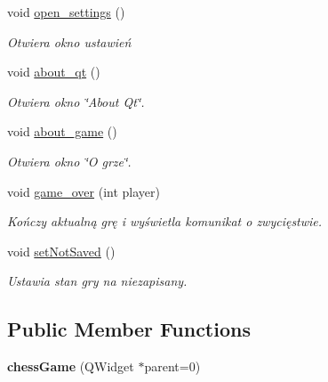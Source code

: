 \begin{DoxyCompactItemize}
\mbox{\label{classchess_game_af4636d3a148b8e910ac093bf419fbac7}} 
void \hyperlink{classchess_game_af4636d3a148b8e910ac093bf419fbac7}{open\+\_\+settings} ()
\begin{DoxyCompactList}\small\item\em Otwiera okno ustawień \end{DoxyCompactList}\item 
\mbox{\label{classchess_game_a00156441ff76452fd40b572683ea99b9}} 
void \hyperlink{classchess_game_a00156441ff76452fd40b572683ea99b9}{about\+\_\+qt} ()
\begin{DoxyCompactList}\small\item\em Otwiera okno \char`\"{}\+About Qt\char`\"{}. \end{DoxyCompactList}\item 
\mbox{\label{classchess_game_a86245fb64348f772be40001d4f063f03}} 
void \hyperlink{classchess_game_a86245fb64348f772be40001d4f063f03}{about\+\_\+game} ()
\begin{DoxyCompactList}\small\item\em Otwiera okno \char`\"{}\+O grze\char`\"{}. \end{DoxyCompactList}\item 
\mbox{\label{classchess_game_a209b5541bf8d34b7f9ff0c48972bf972}} 
void \hyperlink{classchess_game_a209b5541bf8d34b7f9ff0c48972bf972}{game\+\_\+over} (int player)
\begin{DoxyCompactList}\small\item\em Kończy aktualną grę i wyświetla komunikat o zwycięstwie. \end{DoxyCompactList}\item 
\mbox{\label{classchess_game_aa53efb2e6476d9a7445e7a166ebe023b}} 
void \hyperlink{classchess_game_aa53efb2e6476d9a7445e7a166ebe023b}{set\+Not\+Saved} ()
\begin{DoxyCompactList}\small\item\em Ustawia stan gry na niezapisany. \end{DoxyCompactList}\end{DoxyCompactItemize}
\subsection*{Public Member Functions}
\begin{DoxyCompactItemize}
\item 
\mbox{\label{classchess_game_a9d6406de47a97ca52a4016a5caf9f598}} 
{\bfseries chess\+Game} (Q\+Widget $\ast$parent=0)
\end{DoxyCompactItemize}
